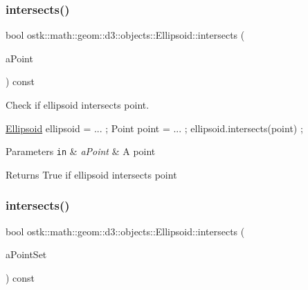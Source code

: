 \subsubsection{\texorpdfstring{intersects()}{intersects()}\hspace{0.1cm}{\footnotesize\ttfamily [1/10]}}
{\footnotesize\ttfamily bool ostk\+::math\+::geom\+::d3\+::objects\+::\+Ellipsoid\+::intersects (\begin{DoxyParamCaption}\item[{const \hyperlink{classostk_1_1math_1_1geom_1_1d3_1_1objects_1_1_point}{Point} \&}]{a\+Point }\end{DoxyParamCaption}) const}



Check if ellipsoid intersects point. 


\begin{DoxyCode}
\hyperlink{classostk_1_1math_1_1geom_1_1d3_1_1objects_1_1_ellipsoid_a106c71abf9503f3d06b2613c1c7e9d65}{Ellipsoid} ellipsoid = ... ;
Point point = ... ;
ellipsoid.intersects(point) ;
\end{DoxyCode}



\begin{DoxyParams}[1]{Parameters}
\mbox{\tt in}  & {\em a\+Point} & A point \\
\hline
\end{DoxyParams}
\begin{DoxyReturn}{Returns}
True if ellipsoid intersects point 
\end{DoxyReturn}
\mbox{\label{classostk_1_1math_1_1geom_1_1d3_1_1objects_1_1_ellipsoid_aba612161728349d5302ce7625674893e}} 
\subsubsection{\texorpdfstring{intersects()}{intersects()}\hspace{0.1cm}{\footnotesize\ttfamily [2/10]}}
{\footnotesize\ttfamily bool ostk\+::math\+::geom\+::d3\+::objects\+::\+Ellipsoid\+::intersects (\begin{DoxyParamCaption}\item[{const \hyperlink{classostk_1_1math_1_1geom_1_1d3_1_1objects_1_1_point_set}{Point\+Set} \&}]{a\+Point\+Set }\end{DoxyParamCaption}) const}




